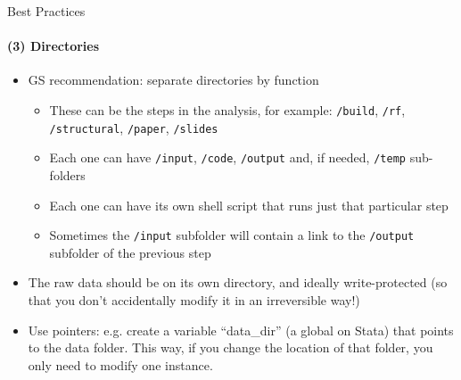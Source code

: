 \documentclass[10pt, aspectratio=169, xcolor=dvipsnames]{beamer}
\let\olditem\item
\renewcommand{\item}{%
\olditem\vspace{0.3em}}
\begin{document}
\begin{frame}[t]{Best Practices}
    \framesubtitle{(3) Directories}

    \normalsize\vspace{0.5em} \begin{itemize}
        \item GS recommendation: separate directories by function \begin{itemize}
            \item These can be the steps in the analysis, for example: \texttt{/build}, \texttt{/rf}, \texttt{/structural}, \texttt{/paper}, \texttt{/slides}
            \item Each one can have \texttt{/input}, \texttt{/code}, \texttt{/output} and, if needed, \texttt{/temp} sub-folders
            \item Each one can have its own shell script that runs just that particular step
            \item Sometimes the \texttt{/input} subfolder will contain a link to the \texttt{/output} subfolder of the previous step
        \end{itemize}
        \item The raw data should be on its own directory, and ideally write-protected (so that you don't accidentally modify it in an irreversible way!)
        \item Use pointers: e.g. create a variable ``data\_dir'' (a global on Stata) that points to the data folder. This way, if you change the location of that folder, you only need to modify one instance.
    \end{itemize}
\end{frame}
\end{document}
